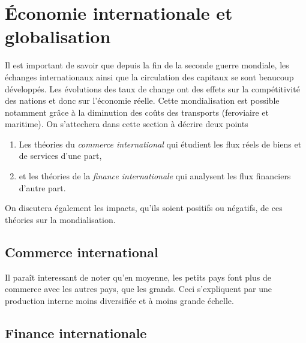 \section{Économie internationale et globalisation} %
\label{sec:economie_internationale_et_globalisation}

Il est important de savoir que depuis la fin de la seconde guerre mondiale,
les échanges internationaux ainsi que la circulation des capitaux se
sont beaucoup développés.
Les évolutions des taux de change ont des effets sur la compétitivité
des nations et donc sur l'économie réelle.
Cette mondialisation est possible notamment grâce à la diminution
des coûts des transports (feroviaire et maritime).
On s'attechera dans cette section à décrire deux points
\begin{enumerate}
  \item Les théories du \emph{commerce international} qui étudient les flux réels de biens 
  et de services d'une part,
  \item et les théories de la \emph{finance internationale} qui analysent les flux 
  financiers d'autre part.
\end{enumerate}
On discutera également les impacts, qu'ils soient positifs ou négatifs,
de ces théories sur la mondialisation.

\subsection{Commerce international} %
\label{sub:commerce_international}
Il paraît interessant de noter qu'en moyenne, les petits pays font plus 
de commerce avec les autres pays, que les grands.
Ceci s'expliquent par une production interne moins diversifiée
et à moins grande échelle.



\subsection{Finance internationale} %
\label{sub:finance_internationale}


